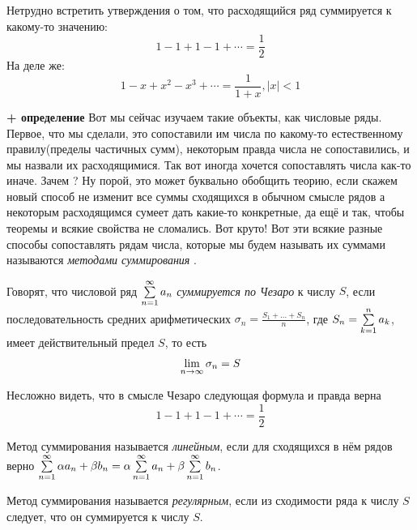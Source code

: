 \begin{example}
	Нетрудно встретить утверждения о том, что расходящийся ряд суммируется к какому-то значению:
	\[
		1 - 1 + 1 - 1 + \cdots = \frac{1}{2}
	\]
	На деле же:
	\[
		1 - x + x^2 - x^3 + \cdots = \frac{1}{1 + x}, |x| < 1
	\]
\end{example}

\begin{note} \textbf{+ определение}
	Вот мы сейчас изучаем такие объекты, как числовые ряды. Первое, что мы сделали, это сопоставили им числа по какому-то естественному правилу(пределы частичных сумм), некоторым правда числа не сопоставились, и мы назвали их расходящимися. Так вот иногда хочется сопоставлять числа как-то иначе. Зачем ? Ну порой, это может буквально обобщить теорию, если скажем новый способ не изменит все суммы сходящихся в обычном смысле рядов а некоторым расходящимся сумеет дать какие-то конкретные, да ещё и так, чтобы теоремы и всякие свойства не сломались. Вот круто! Вот эти всякие разные способы сопоставлять рядам числа, которые мы будем называть их суммами называются \textit{методами суммирования} . 
\end{note}

\begin{definition}
	Говорят, что числовой ряд $\sum\limits_{n = 1}^\infty a_n$ \textit{суммируется по Чезаро} к числу $S$, если последовательность средних арифметических $\sigma_n = \frac{S_1 + \ldots + S_n}{n}$, где $S_n = \sum\limits_{k = 1}^n a_k$, имеет действительный предел $S$, то есть
	\[
	\lim\limits_{n \to \infty} \sigma_n = S
	\]
\end{definition}

\begin{note}
	Несложно видеть, что в смысле Чезаро следующая формула и правда верна
	\[
	1 - 1 + 1 - 1 + \cdots = \frac{1}{2}
	\]
\end{note}

\begin{definition}
	Метод суммирования называется \textit{линейным}, если для сходящихся в нём рядов верно $\sum\limits_{n = 1}^\infty \alpha a_n + \beta b_n = \alpha \sum\limits_{n = 1}^\infty a_n + \beta \sum\limits_{n = 1}^\infty b_n$.
\end{definition}

\begin{definition}
	Метод суммирования называется \textit{регулярным}, если из сходимости ряда к числу $S$ следует, что он суммируется к числу $S$.
\end{definition}

